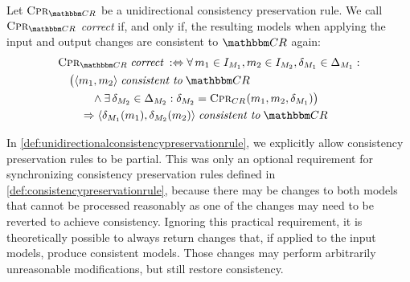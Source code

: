 \begin{definition}
    \label{def:unidirectionalconsistencypreservationrulecorrectness}
    Let $\consistencypreservationrule{\consistencyrelationset{CR}}$ be a unidirectional consistency preservation rule.
    We call $\consistencypreservationrule{\consistencyrelationset{CR}}$ \emph{correct} if, and only if, the resulting models when applying the input and output changes are consistent to $\consistencyrelationset{CR}$ again:
    \begin{align*}
        &
        \consistencypreservationrule{\consistencyrelationset{CR}} \correctmath \equivalentperdefinition 
        \forall 
        \model{m}{1} \in \metamodelinstanceset{M}{1}, 
        \model{m}{2} \in \metamodelinstanceset{M}{2},
        \change{\metamodel{M}{1}} \in \changeuniverse{\metamodel{M}{1}} : \\
        & \formulaskip
        \bigl( \tupled{\model{m}{1}, \model{m}{2}} \consistenttomath \consistencyrelationset{CR} \\
        & \formulaskip\formulaskip\formulaskip
        \land 
        \exists 
        \change{\metamodel{M}{2}} \in \changeuniverse{\metamodel{M}{2}} :
        \change{\metamodel{M}{2}} = \consistencypreservationrule{\consistencyrelation{CR}{}}(\model{m}{1}, \model{m}{2}, \change{\metamodel{M}{1}}) \bigr) \\
        & \formulaskip\formulaskip
        \Rightarrow
        \tupled{\change{\metamodel{M}{1}}(\model{m}{1}), \change{\metamodel{M}{2}}(\model{m}{2})} \consistenttomath \consistencyrelationset{CR}
    \end{align*}
\end{definition}

In \autoref{def:unidirectionalconsistencypreservationrule}, we explicitly allow consistency preservation rules to be partial.
This was only an optional requirement for synchronizing consistency preservation rules defined in \autoref{def:consistencypreservationrule}, because there may be changes to both models that cannot be processed reasonably as one of the changes may need to be reverted to achieve consistency.
Ignoring this practical requirement, it is theoretically possible to always return changes that, if applied to the input models, produce consistent models.
Those changes may perform arbitrarily unreasonable modifications, but still restore consistency.

